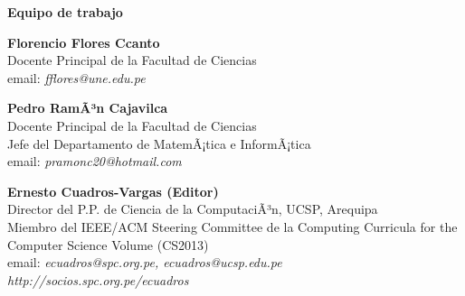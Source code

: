 \begin{center}
{\bf \Huge Equipo de trabajo}
\end{center}
\vspace{1cm}

\begin{center}
\textbf{Florencio Flores Ccanto}\\
Docente Principal de la Facultad de Ciencias\\
email: \textit{fflores@une.edu.pe}\\
\end{center}

\begin{center}
\textbf{Pedro RamÃ³n Cajavilca}\\
Docente Principal de la Facultad de Ciencias\\
Jefe del Departamento de MatemÃ¡tica e InformÃ¡tica\\
email: \textit{pramonc20@hotmail.com}\\
\end{center}

\begin{center}
\textbf{Ernesto Cuadros-Vargas (Editor)}\\
Director del P.P. de Ciencia de la ComputaciÃ³n, UCSP, Arequipa\\
Miembro del IEEE/ACM Steering Committee de la Computing Curricula for the Computer Science Volume (CS2013)\\
email: \textit{ecuadros@spc.org.pe, ecuadros@ucsp.edu.pe}\\
\textit{http://socios.spc.org.pe/ecuadros}
\end{center}

\newpage
